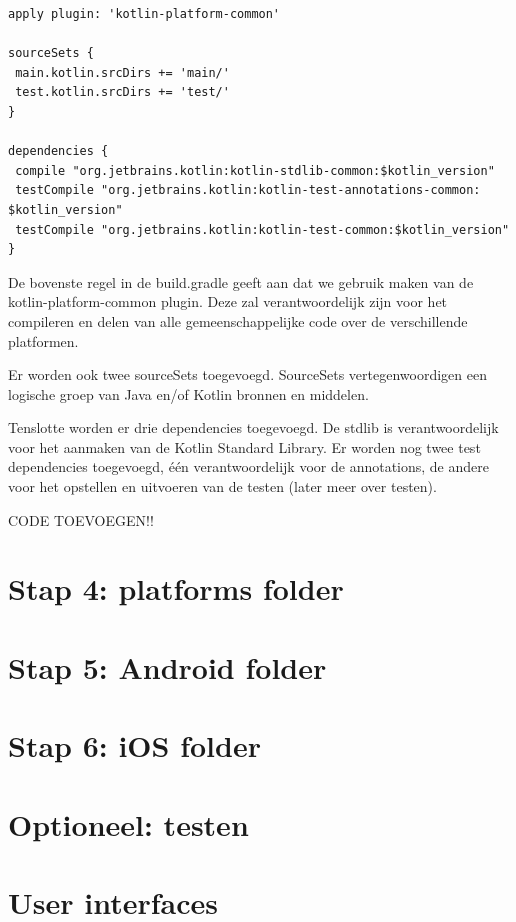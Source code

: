 \begin{lstlisting}
apply plugin: 'kotlin-platform-common'

sourceSets {
 main.kotlin.srcDirs += 'main/'
 test.kotlin.srcDirs += 'test/'
}

dependencies {
 compile "org.jetbrains.kotlin:kotlin-stdlib-common:$kotlin_version"
 testCompile "org.jetbrains.kotlin:kotlin-test-annotations-common: $kotlin_version"
 testCompile "org.jetbrains.kotlin:kotlin-test-common:$kotlin_version"
}
\end{lstlisting}
De bovenste regel in de build.gradle geeft aan dat we gebruik maken van de kotlin-platform-common plugin. Deze zal verantwoordelijk zijn voor het compileren en delen van alle gemeenschappelijke code over de verschillende platformen.

Er worden ook twee sourceSets toegevoegd. SourceSets vertegenwoordigen een logische groep van Java en/of Kotlin bronnen en middelen.

Tenslotte worden er drie dependencies toegevoegd. De stdlib is verantwoordelijk voor het aanmaken van de Kotlin Standard Library. Er worden nog twee test dependencies toegevoegd, één verantwoordelijk voor de annotations, de andere voor het opstellen en uitvoeren van de testen (later meer over testen).

CODE TOEVOEGEN!!

\section{Stap 4: platforms folder}

\section{Stap 5: Android folder}

\section{Stap 6: iOS folder}

\section{Optioneel: testen}

\section{User interfaces}